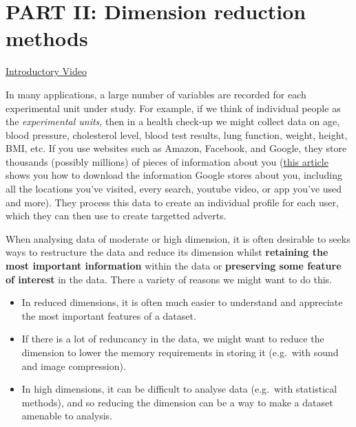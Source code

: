 \documentclass[
]{book}
\providecommand{\tightlist}{%
  \setlength{\itemsep}{0pt}\setlength{\parskip}{0pt}}
\theoremstyle{definition}
\theoremstyle{definition}
\theoremstyle{definition}
\theoremstyle{definition}
\theoremstyle{remark}
\begin{document}
\hypertarget{part-ii-dimension-reduction-methods}{%
\chapter*{PART II: Dimension reduction methods}\label{part-ii-dimension-reduction-methods}}

\href{https://mediaspace.nottingham.ac.uk/media/Part+IIA+Dimension+reduction+introduction/1_0s2cgr1r}{Introductory Video}

In many applications, a large number of variables are recorded for each experimental unit under study. For example, if we think of individual people as the \emph{experimental units}, then in a health check-up we might collect data on age, blood pressure, cholesterol level, blood test results, lung function, weight, height, BMI, etc. If you use websites such as Amazon, Facebook, and Google, they store thousands (possibly millions) of pieces of information about you (\href{https://www.theguardian.com/commentisfree/2018/mar/28/all-the-data-facebook-google-has-on-you-privacy}{this article} shows you how to download the information Google stores about you, including all the locations you've visited, every search, youtube video, or app you've used and more). They process this data to create an individual profile for each user, which they can then use to create targetted adverts.

When analysing data of moderate or high dimension, it is often desirable to seeks ways to restructure the data and reduce its dimension whilst \textbf{retaining the most important information} within the data or \textbf{preserving some feature of interest} in the data. There a variety of reasons we might want to do this.

\begin{itemize}
\tightlist
\item
  In reduced dimensions, it is often much easier to understand and appreciate the most important features of a dataset.
\item
  If there is a lot of reduncancy in the data, we might want to reduce the dimension to lower the memory requirements in storing it (e.g.~with sound and image compression).
\item
  In high dimensions, it can be difficult to analyse data (e.g.~with statistical methods), and so reducing the dimension can be a way to make a dataset amenable to analysis.
\end{itemize}
\end{document}
